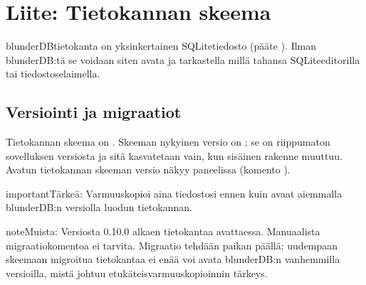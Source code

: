\documentclass[letterpaper,10pt,finnish]{sphinxmanual}
\begin{document}
\sphinxstepscope


\section{Liite: Tietokannan skeema}
\label{\detokenize{annexe_db_scheme:annexe-schema-de-la-base-de-donnees}}\label{\detokenize{annexe_db_scheme:annexe-db-migration}}\label{\detokenize{annexe_db_scheme::doc}}
\sphinxAtStartPar
blunderDB\sphinxhyphen{}tietokanta on yksinkertainen SQLite\sphinxhyphen{}tiedosto (pääte ). Ilman blunderDB:tä se voidaan siten avata ja tarkastella millä tahansa SQLite\sphinxhyphen{}editorilla tai \sphinxhyphen{}tiedostoselaimella.


\subsection{Versiointi ja migraatiot}
\label{\detokenize{annexe_db_scheme:versionnage-et-migrations}}
\sphinxAtStartPar
Tietokannan skeema on . Skeeman nykyinen versio on ; se on riippumaton sovelluksen versiosta ja sitä kasvatetaan vain, kun sisäinen rakenne muuttuu. Avatun tietokannan skeeman versio näkyy \sphinxhyphen{}paneelissa (komento ).

\begin{sphinxadmonition}{important}{Tärkeä:}
\sphinxAtStartPar
Varmuuskopioi aina \sphinxhyphen{}tiedostosi ennen kuin avaat aiemmalla blunderDB:n versiolla luodun tietokannan.
\end{sphinxadmonition}

\begin{sphinxadmonition}{note}{Muista:}
\sphinxAtStartPar
Versiosta 0.10.0 alkaen  tietokantaa avattaessa. Manuaalista migraatiokomentoa ei tarvita. Migraatio tehdään paikan päällä: uudempaan skeemaan migroitua tietokantaa ei enää voi avata blunderDB:n vanhemmilla versioilla, mistä johtuu etukäteisvarmuuskopioinnin tärkeys.
\end{sphinxadmonition}
\end{document}
